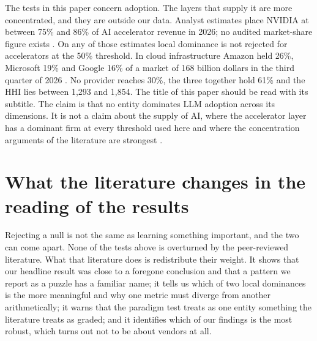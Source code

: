 \documentclass[11pt]{article}
\begin{document}
The tests in this paper concern adoption. The layers that supply it are more concentrated, and they are outside our data. Analyst estimates place NVIDIA at between 75\% and 86\% of AI accelerator revenue in 2026; no audited market-share figure exists \cite{siliconanalysts2026chain,mordor2026gpu}. On any of those estimates local dominance is not rejected for accelerators at the 50\% threshold. In cloud infrastructure Amazon held 26\%, Microsoft 19\% and Google 16\% of a market of 168 billion dollars in the third quarter of 2026 \cite{synergy2026q3}. No provider reaches 30\%, the three together hold 61\% and the HHI lies between 1{,}293 and 1{,}854. The title of this paper should be read with its subtitle. The claim is that no entity dominates LLM adoption across its dimensions. It is not a claim about the supply of AI, where the accelerator layer has a dominant firm at every threshold used here and where the concentration arguments of the literature are strongest \cite{korinek2025concentrating}.

\section{What the literature changes in the reading of the results}
\label{sec:lit}

Rejecting a null is not the same as learning something important, and the two can come apart. None of the tests above is overturned by the peer-reviewed literature. What that literature does is redistribute their weight. It shows that our headline result was close to a foregone conclusion and that a pattern we report as a puzzle has a familiar name; it tells us which of two local dominances is the more meaningful and why one metric must diverge from another arithmetically; it warns that the paradigm test treats as one entity something the literature treats as graded; and it identifies which of our findings is the most robust, which turns out not to be about vendors at all.
\end{document}
